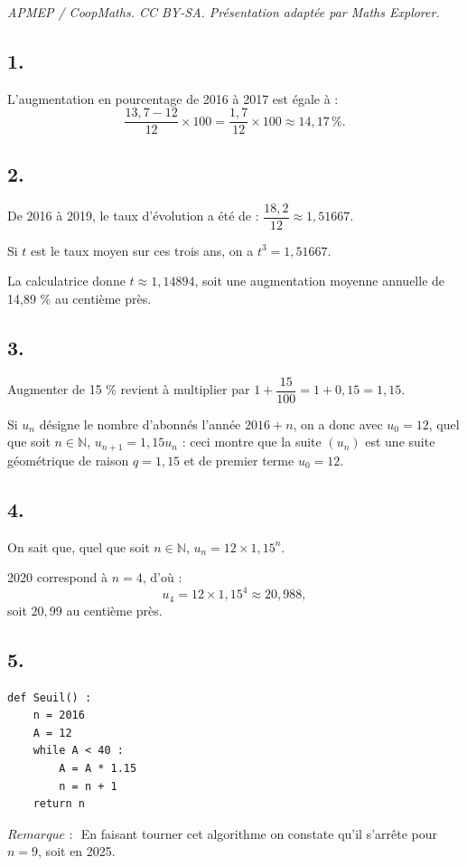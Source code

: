 \documentclass[10pt]{article}
\begin{document}
\noindent\textit{APMEP / CoopMaths. CC BY-SA. Présentation adaptée par Maths Explorer.}\par\medskip
\subsection*{1.}

L'augmentation en pourcentage de 2016 à 2017 est égale à :
\[
\dfrac{13{,}7 - 12}{12} \times 100 = \dfrac{1{,}7}{12} \times 100 \approx 14{,}17 \, \%.
\]

\subsection*{2.}

De 2016 à 2019, le taux d'évolution a été de : \(\dfrac{18{,}2}{12} \approx 1{,}51667\).

Si \( t \) est le taux moyen sur ces trois ans, on a \( t^3 = 1{,}51667 \).

La calculatrice donne \( t \approx 1{,}14894 \), soit une augmentation moyenne annuelle de 14,89 \% au centième près.

\subsection*{3.}

Augmenter de 15 \% revient à multiplier par \( 1 + \dfrac{15}{100} = 1 + 0{,}15 = 1{,}15 \).

Si \( u_n \) désigne le nombre d'abonnés l'année \( 2016 + n \), on a donc avec \( u_0 = 12 \), quel que soit \( n \in \mathbb{N} \), \( u_{n+1} = 1{,}15 u_n \) : ceci montre que la suite \( (u_n) \) est une suite géométrique de raison \(q = 1,15\) et de premier terme \( u_0 = 12 \).

\subsection*{4.}

On sait que, quel que soit \( n \in \mathbb{N} \), \( u_n = 12 \times 1{,}15^n \).

2020 correspond à \( n = 4 \), d'où :
\[
u_4 = 12 \times 1{,}15^4 \approx 20{,}988,
\]
soit \(20{,}99\) au centième près.

\subsection*{5.}

\begin{center}
\begin{lstlisting}[style=python]
def Seuil() :
    n = 2016
    A = 12
    while A < 40 :
        A = A * 1.15
        n = n + 1
    return n
\end{lstlisting}
\end{center}

\(\textit{Remarque : }\) En faisant tourner cet algorithme on constate qu'il s'arrête pour \( n = 9 \), soit en 2025.
\end{document}
